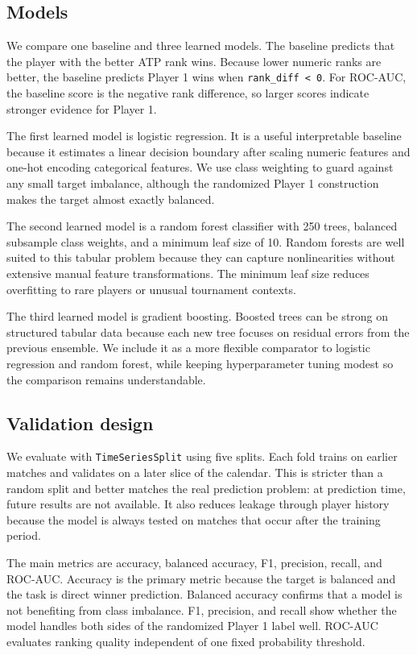 \documentclass{article}
\begin{document}
\subsection{Models}

We compare one baseline and three learned models. The baseline predicts that the player with the better ATP rank wins. Because lower numeric ranks are better, the baseline predicts Player 1 wins when \texttt{rank\_diff < 0}. For ROC-AUC, the baseline score is the negative rank difference, so larger scores indicate stronger evidence for Player 1.

The first learned model is logistic regression. It is a useful interpretable baseline because it estimates a linear decision boundary after scaling numeric features and one-hot encoding categorical features. We use class weighting to guard against any small target imbalance, although the randomized Player 1 construction makes the target almost exactly balanced.

The second learned model is a random forest classifier with 250 trees, balanced subsample class weights, and a minimum leaf size of 10. Random forests are well suited to this tabular problem because they can capture nonlinearities without extensive manual feature transformations. The minimum leaf size reduces overfitting to rare players or unusual tournament contexts.

The third learned model is gradient boosting. Boosted trees can be strong on structured tabular data because each new tree focuses on residual errors from the previous ensemble. We include it as a more flexible comparator to logistic regression and random forest, while keeping hyperparameter tuning modest so the comparison remains understandable.

\subsection{Validation design}

We evaluate with \texttt{TimeSeriesSplit} using five splits. Each fold trains on earlier matches and validates on a later slice of the calendar. This is stricter than a random split and better matches the real prediction problem: at prediction time, future results are not available. It also reduces leakage through player history because the model is always tested on matches that occur after the training period.

The main metrics are accuracy, balanced accuracy, F1, precision, recall, and ROC-AUC. Accuracy is the primary metric because the target is balanced and the task is direct winner prediction. Balanced accuracy confirms that a model is not benefiting from class imbalance. F1, precision, and recall show whether the model handles both sides of the randomized Player 1 label well. ROC-AUC evaluates ranking quality independent of one fixed probability threshold.
\end{document}
